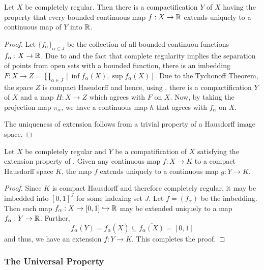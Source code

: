     
\begin{theorem}
    Let $X$ be completely regular. Then there is a compactification $Y$ of $X$ having the property that every bounded continuous map $f: X\to\mathbb{R}$ extends uniquely to a continuous map of $Y$ into $\mathbb{R}$.
\end{theorem}
\begin{proof}
    Let $\{f_\alpha\}_{\alpha\in J}$ be the collection of all bounded continuou functions $f_\alpha: X\to\mathbb{R}$. Due to  and the fact that complete regularity implies the separation of points from open sets with a bounded function, there is an imbedding $F: X\to Z = \prod_{\alpha\in J}[\inf f_\alpha(X), \sup f_\alpha(X)]$. Due to the Tychonoff Theorem, the space $Z$ is compact Hasudorff and hence, using , there is a compactification $Y$ of $X$ and a map $H: X\to Z$ which agrees with $F$ on $X$. Now, by taking the projection map $\pi_\alpha$, we have a continuous map $h$ that agrees with $f_\alpha$ on $X$.

    The uniqueness of extension follows from a trivial property of a Hausdorff image space.
\end{proof}

\begin{theorem}
    Let $X$ be completely regular and $Y$ be a compatification of $X$ satisfying the extension property of . Given any continuous map $f: X\to K$ to a compact Hausdorff space $K$, the map $f$ extends uniquely to a continuous map $g: Y\to K$.
\end{theorem}
\begin{proof}
    Since $K$ is compact Hausdorff and therefore completely regular, it may be imbedded into $[0,1]^J$ for some indexing set $J$. Let $f = (f_\alpha)$ be the imbedding. Then each map $f_\alpha: X\to[0,1]\hookrightarrow\mathbb{R}$ may be extended uniquely to a map $f_\alpha: Y\to\mathbb{R}$. Further, 
    \begin{equation*}
        f_\alpha(Y) = f_\alpha(\overline X)\subseteq\overline{f_\alpha(X)} = [0,1]
    \end{equation*}
    and thus, we have an extension $f: Y\to K$. This completes the proof.
\end{proof}

\subsubsection*{The Universal Property}

